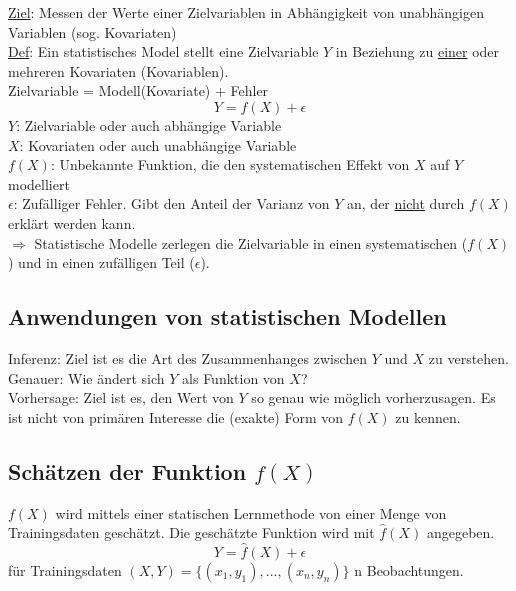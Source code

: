 \documentclass[10pt]{report}
\theoremstyle{definition}
\begin{document}
\underline{Ziel}: Messen der Werte einer Zielvariablen in Abhängigkeit von unabhängigen Variablen (sog. Kovariaten) \\
\underline{Def}: Ein statistisches Model stellt eine Zielvariable $Y$ in Beziehung zu \underline{einer} oder mehreren Kovariaten (Kovariablen). \\
Zielvariable = Modell(Kovariate) + Fehler \\
\[ Y = f(X) + \epsilon \]
$Y$: Zielvariable oder auch abhängige Variable \\
$X$: Kovariaten oder auch unabhängige Variable \\
$f(X)$: Unbekannte Funktion, die den systematischen Effekt von $X$ auf $Y$ modelliert \\
$\epsilon$: Zufälliger Fehler. Gibt den Anteil der Varianz von $Y$ an, der \underline{nicht} durch $f(X)$ erklärt werden kann. \\
$\Rightarrow$ Statistische Modelle zerlegen die Zielvariable in einen systematischen ($f(X)$) und in einen zufälligen Teil ($\epsilon$). \\

\subsection{Anwendungen von statistischen Modellen}
Inferenz: Ziel ist es die Art des Zusammenhanges zwischen $Y$ und $X$ zu verstehen. Genauer: Wie ändert sich $Y$ als Funktion von $X$?\\
Vorhersage: Ziel ist es, den Wert von $Y$ so genau wie möglich vorherzusagen. Es ist nicht von primären Interesse die (exakte) Form von $f(X)$ zu kennen. \\

\subsection{Schätzen der Funktion $f(X)$}
$f(X)$ wird mittels einer statischen Lernmethode von einer Menge von Trainingsdaten geschätzt. Die geschätzte Funktion wird mit $\hat{f}(X)$ angegeben.
\[ Y = \hat{f}(X) + \epsilon \]
für Trainingsdaten $(X,Y) = \{(x_1,y_1),...,(x_n,y_n)\}$ n Beobachtungen.
\end{document}
